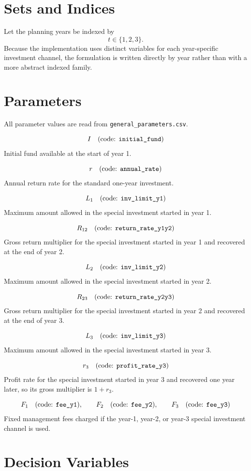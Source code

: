 \section*{Sets and Indices}

Let the planning years be indexed by
\[
t \in \{1,2,3\}.
\]
Because the implementation uses distinct variables for each year-specific investment channel, the formulation is written directly by year rather than with a more abstract indexed family.

\section*{Parameters}

All parameter values are read from \texttt{general\_parameters.csv}.

\[
I \quad \text{(code: \texttt{initial\_fund})}
\]
Initial fund available at the start of year 1.

\[
r \quad \text{(code: \texttt{annual\_rate})}
\]
Annual return rate for the standard one-year investment.

\[
L_1 \quad \text{(code: \texttt{inv\_limit\_y1})}
\]
Maximum amount allowed in the special investment started in year 1.

\[
R_{12} \quad \text{(code: \texttt{return\_rate\_y1y2})}
\]
Gross return multiplier for the special investment started in year 1 and recovered at the end of year 2.

\[
L_2 \quad \text{(code: \texttt{inv\_limit\_y2})}
\]
Maximum amount allowed in the special investment started in year 2.

\[
R_{23} \quad \text{(code: \texttt{return\_rate\_y2y3})}
\]
Gross return multiplier for the special investment started in year 2 and recovered at the end of year 3.

\[
L_3 \quad \text{(code: \texttt{inv\_limit\_y3})}
\]
Maximum amount allowed in the special investment started in year 3.

\[
r_3 \quad \text{(code: \texttt{profit\_rate\_y3})}
\]
Profit rate for the special investment started in year 3 and recovered one year later, so its gross multiplier is \(1+r_3\).

\[
F_1 \quad \text{(code: \texttt{fee\_y1})}, \qquad
F_2 \quad \text{(code: \texttt{fee\_y2})}, \qquad
F_3 \quad \text{(code: \texttt{fee\_y3})}
\]
Fixed management fees charged if the year-1, year-2, or year-3 special investment channel is used.

\section*{Decision Variables}

